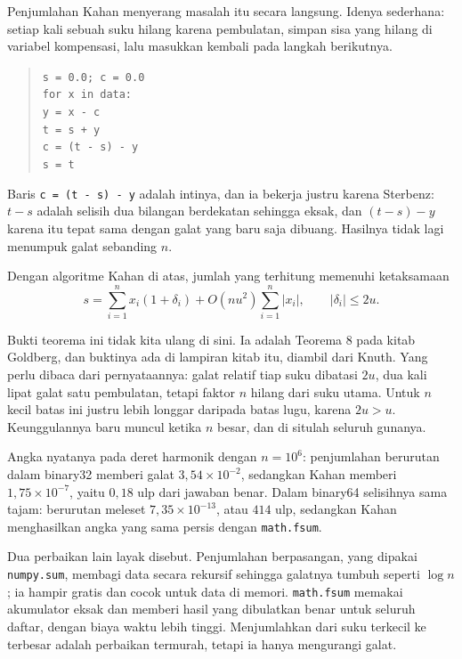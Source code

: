Penjumlahan Kahan menyerang masalah itu secara langsung.
Idenya sederhana: setiap kali
sebuah suku hilang karena pembulatan, simpan sisa yang hilang di variabel kompensasi,
lalu masukkan kembali pada langkah berikutnya.

\begin{quote}
\texttt{s = 0.0; c = 0.0}\\
\texttt{for x in data:}\\
\hspace*{1.5em}\texttt{y = x - c}\\
\hspace*{1.5em}\texttt{t = s + y}\\
\hspace*{1.5em}\texttt{c = (t - s) - y}\\
\hspace*{1.5em}\texttt{s = t}
\end{quote}

Baris \texttt{c = (t - s) - y} adalah intinya, dan ia bekerja justru karena Sterbenz:
$t-s$ adalah selisih dua bilangan berdekatan sehingga eksak, dan $(t-s)-y$ karena itu
tepat sama dengan galat yang baru saja dibuang. Hasilnya tidak lagi menumpuk galat
sebanding $n$.

\begin{teorema}
Dengan algoritme Kahan di atas, jumlah yang terhitung memenuhi ketaksamaan
\[
  s=\sum_{i=1}^{n}x_{i}(1+\delta_{i})+O(nu^{2})\sum_{i=1}^{n}|x_{i}|,
  \qquad |\delta_{i}|\le2u .
\]
\end{teorema}

Bukti teorema ini tidak kita ulang di sini. Ia adalah Teorema 8 pada kitab Goldberg,
dan buktinya ada di lampiran kitab itu, diambil dari Knuth. Yang perlu dibaca dari
pernyataannya: galat relatif tiap suku dibatasi $2u$, dua kali lipat galat satu
pembulatan, tetapi faktor $n$ hilang dari suku utama. Untuk $n$ kecil batas ini justru
lebih longgar daripada batas lugu, karena $2u>u$. Keunggulannya baru muncul ketika
$n$ besar, dan di situlah seluruh gunanya.

Angka nyatanya pada deret harmonik dengan $n=10^{6}$: penjumlahan berurutan dalam
binary32 memberi galat $3{,}54\times10^{-2}$, sedangkan Kahan memberi
$1{,}75\times10^{-7}$, yaitu $0{,}18$ ulp dari jawaban benar. Dalam binary64
selisihnya sama tajam: berurutan meleset $7{,}35\times10^{-13}$, atau $414$ ulp,
sedangkan Kahan menghasilkan angka yang sama persis dengan \texttt{math.fsum}.

Dua perbaikan lain layak disebut. Penjumlahan berpasangan, yang dipakai
\texttt{numpy.sum}, membagi data secara rekursif
sehingga galatnya tumbuh seperti $\log n$; ia hampir gratis dan cocok untuk data di
memori. \texttt{math.fsum} memakai akumulator eksak dan memberi hasil yang dibulatkan
benar untuk seluruh daftar, dengan biaya waktu lebih tinggi. Menjumlahkan dari suku
terkecil ke terbesar adalah perbaikan termurah, tetapi ia hanya mengurangi galat.


